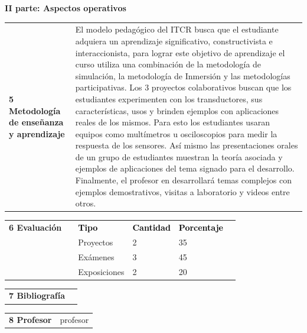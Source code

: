 \documentclass[letterpaper]{article}%
\begin{document}
\par\fontsize{14}{0}\selectfont \textbf{\textcolor{parte}{II parte: Aspectos operativos}}%
\par\fontsize{12}{0}\selectfont \textbf{\textcolor{parte}{ }}%
\renewcommand{\arraystretch}{1.5}%
\begin{longtable}{>{\raggedright}p{}p{}}%
\par\fontsize{12}{0}\selectfont \textbf{\textcolor{parte}{5 Metodología de enseñanza y aprendizaje}}&El modelo pedagógico del ITCR busca que el estudiante adquiera un aprendizaje significativo, constructivista e interaccionista, para lograr este objetivo de aprendizaje el curso utiliza una combinación de la metodología de simulación, la metodología de Inmersión y las metodologías participativas.
\newline%
Los 3 proyectos colaborativos buscan que los estudiantes experimenten con los transductores, sus características, usos y brinden ejemplos con aplicaciones reales de los mismos. Para esto los estudiantes usaran equipos como multímetros u osciloscopios para medir la respuesta de los sensores. Así mismo las presentaciones orales de un grupo de estudiantes muestran la teoría asociada y ejemplos de aplicaciones del tema signado para el desarrollo. Finalmente, el profesor en desarrollará temas complejos con ejemplos demostrativos, visitas a laboratorio y videos entre otros.\\%
\end{longtable}%
\renewcommand{\arraystretch}{2}%
\begin{longtable}{>{\raggedright}p{}p{}p{}p{}p{}p{}}%
\par\fontsize{12}{0}\selectfont \textbf{\textcolor{parte}{6 Evaluación}}&&\par\fontsize{12}{16}\selectfont \textbf{\textcolor{black}{Tipo}}&\par\fontsize{12}{16}\selectfont \textbf{\textcolor{black}{Cantidad}}&\par\fontsize{12}{16}\selectfont \textbf{\textcolor{black}{Porcentaje}}&\\%
&&Proyectos& 2& 35&\\%
&&Exámenes& 3& 45&\\%
&&Exposiciones& 2& 20&\\%
\end{longtable}%
\renewcommand{\arraystretch}{1.5}%
\begin{longtable}{>{\raggedright}p{}p{}}%
\par\fontsize{12}{0}\selectfont \textbf{\textcolor{parte}{7 Bibliografía}}&
\nocite{pallas2012sensors}
\nocite{fraden2016handbook}
\printbibliography[heading=none]\\%
\end{longtable}%
\renewcommand{\arraystretch}{1.5}%
\begin{longtable}{>{\raggedright}p{}p{}}%
\par\fontsize{12}{0}\selectfont \textbf{\textcolor{parte}{8 Profesor}}&profesor\\%
\end{longtable}%
\end{document}
